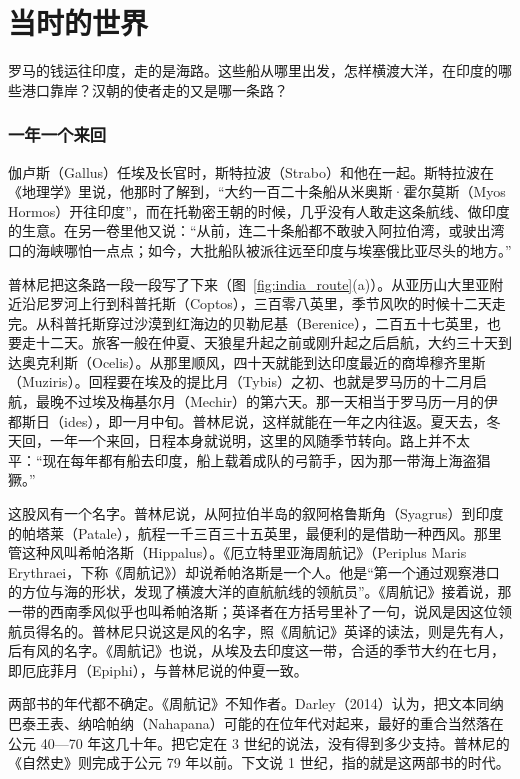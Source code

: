 \section{当时的世界}\label{sec:india-world}

罗马的钱运往印度，走的是海路。这些船从哪里出发，怎样横渡大洋，在印度的哪些港口靠岸？汉朝的使者走的又是哪一条路？

\subsubsection{一年一个来回}
伽卢斯（Gallus）任埃及长官时，斯特拉波（Strabo）和他在一起。斯特拉波在《地理学》里说，他那时了解到，“大约一百二十条船从米奥斯·霍尔莫斯（Myos Hormos）开往印度”，而在托勒密王朝的时候，几乎没有人敢走这条航线、做印度的生意\cite{strabo}。在另一卷里他又说：“从前，连二十条船都不敢驶入阿拉伯湾，或驶出湾口的海峡哪怕一点点；如今，大批船队被派往远至印度与埃塞俄比亚尽头的地方。”\cite{strabo}

普林尼把这条路一段一段写了下来（图~\ref{fig:india_route}(a)）。从亚历山大里亚附近沿尼罗河上行到科普托斯（Coptos），三百零八英里，季节风吹的时候十二天走完。从科普托斯穿过沙漠到红海边的贝勒尼基（Berenice），二百五十七英里，也要走十二天。旅客一般在仲夏、天狼星升起之前或刚升起之后启航，大约三十天到达奥克利斯（Ocelis）。从那里顺风，四十天就能到达印度最近的商埠穆齐里斯（Muziris）\cite{pliny}。回程要在埃及的提比月（Tybis）之初、也就是罗马历的十二月启航，最晚不过埃及梅基尔月（Mechir）的第六天。那一天相当于罗马历一月的伊都斯日（ides），即一月中旬。普林尼说，这样就能在一年之内往返\cite{pliny}。夏天去，冬天回，一年一个来回，日程本身就说明，这里的风随季节转向。路上并不太平：“现在每年都有船去印度，船上载着成队的弓箭手，因为那一带海上海盗猖獗。”\cite{pliny}

这股风有一个名字。普林尼说，从阿拉伯半岛的叙阿格鲁斯角（Syagrus）到印度的帕塔莱（Patale），航程一千三百三十五英里，最便利的是借助一种西风。那里管这种风叫希帕洛斯（Hippalus）\cite{pliny}。《厄立特里亚海周航记》（Periplus Maris Erythraei，下称《周航记》）却说希帕洛斯是一个人。他是“第一个通过观察港口的方位与海的形状，发现了横渡大洋的直航航线的领航员”。《周航记》接着说，那一带的西南季风似乎也叫希帕洛斯；英译者在方括号里补了一句，说风是因这位领航员得名的\cite{periplus}。普林尼只说这是风的名字，照《周航记》英译的读法，则是先有人，后有风的名字。《周航记》也说，从埃及去印度这一带，合适的季节大约在七月，即厄庇菲月（Epiphi）\cite{periplus}，与普林尼说的仲夏一致。

两部书的年代都不确定。《周航记》不知作者。Darley（2014）认为，把文本同纳巴泰王表、纳哈帕纳（Nahapana）可能的在位年代对起来，最好的重合当然落在公元 40—70 年这几十年。把它定在 3 世纪的说法，没有得到多少支持\cite{darley2014}。普林尼的《自然史》则完成于公元 79 年以前\cite{darley2014}。下文说 1 世纪，指的就是这两部书的时代。

